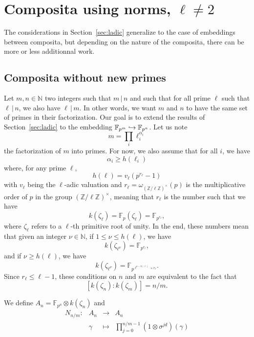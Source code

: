 \documentclass[a4paper,11pt]{article}
\begin{document}
\section{Composita using norms, $\ell\neq2$}

The considerations in Section~\ref{sec:ladic} generalize to the case of
embeddings between composita, but depending on the nature of the composita,
there can be more or less additionnal work.

\subsection{Composita without new primes}
\label{sec:comp-norm-wo}

Let $m, n\in\mathbb{N}$
two integers such that $m\,|\,n$ and such that for all prime $\ell$ such that
$\ell\,|\,n$, we also have $\ell\,|\,m$. In other words, we want $m$ and $n$ to
have the same set of primes in their factorization. Our goal is to extend the
results of Section~\ref{sec:ladic} to the embedding
$\mathbb{F}_{p^m}\hookrightarrow\mathbb{F}_{p^n}$. Let us note 
\[
  m = \prod_i \ell_i^{\alpha_i}
\]
the factorization of $m$ into primes. For now, we also assume that for all $i$,
we have 
\[
  \alpha_i\geq h(\ell_i)
\]
where, for any prime $\ell$, 
\[
  h(\ell) = v_\ell(p^{r_\ell}-1)
\]
with $v_\ell$ being the $\ell$-adic valuation and
$r_\ell=\omega_{(\mathbb{Z}/\ell\mathbb{Z})^\times}(p)$ is the multiplicative
order of $p$ in the group $(\mathbb{Z}/\ell\mathbb{Z})^\times$, meaning that
$r_\ell$ is the number such that we have 
\[
  k(\zeta_\ell)=\mathbb{F}_p(\zeta_\ell)=\mathbb{F}_{p^{r_\ell}},
\]
where $\zeta_\ell$ refers to a $\ell$-th primitive root of unity.
In the end, these numbers mean that given an integer $\nu\in\mathbb{N}$, if
$1\leq\nu\leq h(\ell)$, we have
\[
  k(\zeta_{\ell^\nu}) = \mathbb{F}_{p^{r_\ell}},
\]
and if $\nu\geq h(\ell)$, we have
\[
  k(\zeta_{\ell^\nu}) = \mathbb{F}_{p^{\ell^{\nu-h(\ell)}\times r_\ell}}.
\]
Since $r_\ell\leq\ell-1$, these conditions on $n$ and $m$ are equivalent to the fact that
\[
  [k(\zeta_n):k(\zeta_m)] = n/m.
\]

We define $A_n=\mathbb{F}_{p^n}\otimes k(\zeta_n)$ and
\[
\begin{array}{cccc}
  N_{n/m}: & A_n & \to & A_n \\
  & \gamma & \mapsto & \prod_{j=0}^{n/m-1} (1\otimes \sigma^{jd})(\gamma)
\end{array}
\]
\end{document}
